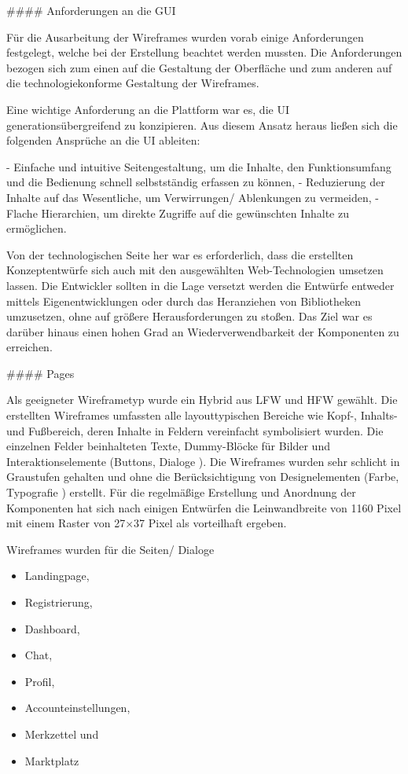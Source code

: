 \#\#\#\# Anforderungen an die GUI

Für die Ausarbeitung der Wireframes wurden vorab einige Anforderungen festgelegt, welche bei der Erstellung beachtet werden mussten. Die Anforderungen bezogen sich zum einen auf die Gestaltung der Oberfläche und zum anderen auf die technologiekonforme Gestaltung der Wireframes.

Eine wichtige Anforderung an die Plattform war es, die UI generationsübergreifend zu konzipieren. Aus diesem Ansatz heraus ließen sich die folgenden Ansprüche an die UI ableiten:

- Einfache und intuitive Seitengestaltung, um die Inhalte, den Funktionsumfang und die Bedienung schnell selbstständig erfassen zu können,
- Reduzierung der Inhalte auf das Wesentliche, um Verwirrungen/ Ablenkungen zu vermeiden,
- Flache Hierarchien, um direkte Zugriffe auf die gewünschten Inhalte zu ermöglichen.

Von der technologischen Seite her war es erforderlich, dass die erstellten Konzeptentwürfe sich auch mit den ausgewählten Web-Technologien umsetzen lassen. Die Entwickler sollten in die Lage versetzt werden die Entwürfe entweder mittels Eigenentwicklungen oder durch das Heranziehen von Bibliotheken umzusetzen, ohne auf größere Herausforderungen zu stoßen. Das Ziel war es darüber hinaus einen hohen Grad an Wiederverwendbarkeit der Komponenten zu erreichen.

\#\#\#\# Pages

Als geeigneter Wireframetyp wurde ein Hybrid aus LFW und HFW gewählt. Die erstellten Wireframes umfassten alle layouttypischen Bereiche wie Kopf-, Inhalts- und Fußbereich, deren Inhalte in Feldern vereinfacht symbolisiert wurden. Die einzelnen Felder beinhalteten Texte, Dummy-Blöcke \bspw für Bilder und Interaktionselemente (Buttons, Dialoge \usw).
Die Wireframes wurden sehr schlicht in Graustufen gehalten und ohne die Berücksichtigung von Designelementen (Farbe, Typografie \usw) erstellt. Für die regelmäßige Erstellung und Anordnung der Komponenten hat sich nach einigen Entwürfen die Leinwandbreite von 1160 Pixel mit einem Raster von 27×37 Pixel als vorteilhaft ergeben.

Wireframes wurden für die Seiten/ Dialoge

\begin{itemize}
    \item Landingpage,
    \item Registrierung,
    \item Dashboard,
    \item Chat,
    \item Profil,
    \item Accounteinstellungen,
    \item Merkzettel und
    \item Marktplatz
\end{itemize}

